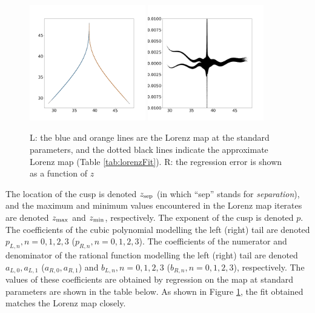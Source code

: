\begin{figure}
		\includegraphics[width=0.45\textwidth]{lorenz_map_fit_lorenz_zmax_10_28_2.6666666666666665.npy.png}
		\includegraphics[width=0.45\textwidth]{lorenz_map_fit_error_lorenz_zmax_10_28_2.6666666666666665.npy.png}
		\caption{L: the blue and orange lines are the Lorenz map at the standard parameters, and the dotted black lines indicate the approximate Lorenz map (Table \ref{tab:lorenzFit}). R: the regression error is shown as a function of $z$} 
	\label{fig:lorenzMapComp}
\end{figure}
The location of the cusp is denoted $z_{\rm sep}$ (in which ``sep'' stands 
for \emph{separation}), and the maximum and minimum values encountered 
in the Lorenz map iterates are denoted $z_{\rm max}$ and $z_{\rm min}$, respectively. The exponent of the cusp is denoted $p$. The coefficients of the cubic polynomial modelling the left (right) tail are  denoted $p_{L,n}, n = 0,1,2,3$ ($p_{R,n}, n = 0,1,2,3$). The coefficients of the numerator and denominator of the rational function modelling the left (right) tail are denoted $a_{L,0}, a_{L,1}$ ($a_{R,0}, a_{R,1}$) and $b_{L,n}, n=0,1,2,3$ ($b_{R,n}, n=0,1,2,3$), respectively. The values of these coefficients are obtained by 
regression on the map at standard parameters are shown in the table below. As shown in Figure \ref{fig:lorenzMapComp}, the fit obtained matches the Lorenz map closely.
